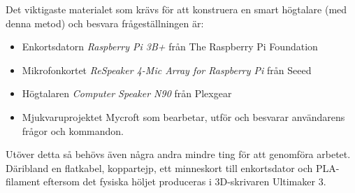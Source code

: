 Det viktigaste materialet som krävs för att konstruera en smart högtalare (med denna metod) och besvara frågeställningen är:
\begin{itemize}
\item Enkortsdatorn \textit{Raspberry Pi 3B+} från The Raspberry Pi Foundation
\item Mikrofonkortet \textit{ReSpeaker 4-Mic Array for Raspberry Pi} från Seeed
\item Högtalaren \textit{Computer Speaker N90 }från Plexgear
\item Mjukvaruprojektet Mycroft som bearbetar, utför och besvarar användarens frågor och kommandon.
\end{itemize}
Utöver detta så behövs även några andra mindre ting för att genomföra arbetet. Däribland en flatkabel, koppartejp, ett minneskort till enkortsdator och PLA-filament eftersom det fysiska höljet produceras i 3D-skrivaren Ultimaker 3.
